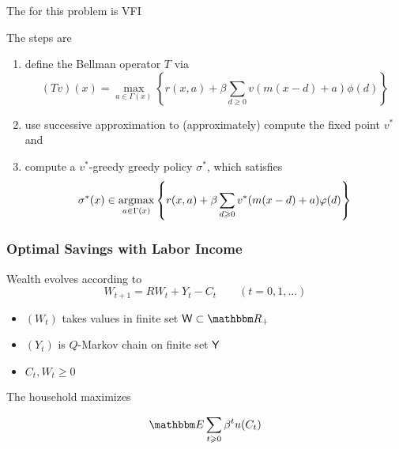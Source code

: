 \begin{frame}
    
    The  for this problem is VFI

    The steps are
    \begin{enumerate}
        \item define the Bellman operator $T$ via
            \begin{equation*}
                (Tv)(x)
                = \max_{a \in \Gamma(x)} 
                \left\{
                    r(x, a)
                    + \beta
                    \sum_{d \geq 0} v(m(x - d) + a) \phi(d)
                \right\}
            \end{equation*}
        \item use successive approximation to (approximately) compute the
            fixed point $v^*$ and
        \item compute a $v^*$-greedy greedy policy $\sigma^*$, which satisfies
            \begin{equation*}
                \sigma^*(x)
                \in \argmax_{a \in \Gamma(x)} 
                \left\{
                    r(x, a)
                    + \beta
                    \sum_{d \geq 0} v^*(m(x - d) + a) \phi(d)
                \right\}
            \end{equation*}
    \end{enumerate}

\end{frame}



\begin{frame}
    \frametitle{Optimal Savings with Labor Income}

    
    Wealth evolves according to
    \begin{equation*}
        W_{t+1} = R W_t + Y_t - C_t
        \qquad (t = 0, 1, \ldots)
    \end{equation*}

        \vspace{0.5em}
    \begin{itemize}
        \item $(W_t)$ takes values in finite set $\Wsf \subset \RR_+$ 
        \vspace{0.5em}
        \item $(Y_t)$ is $Q$-Markov chain on finite set $\mathsf Y$ 
        \vspace{0.5em}
        \item $C_t, W_t \geq 0$
    \end{itemize}

        \vspace{0.5em}
    The household maximizes

    \begin{equation*}
        \EE \sum_{t \geq 0} \beta^t u(C_t)
    \end{equation*}


\end{frame}


